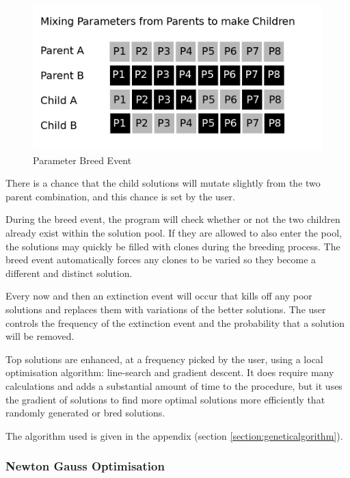 \begin{figure}[h]
  \begin{center}
    \includegraphics[scale=0.30]{chapters/potentials_fe_pd_ru/images/breeding.png}
    \caption{Parameter Breed Event}
    \label{fig:gabreedevent}
  \end{center}
\end{figure}

There is a chance that the child solutions will mutate slightly from the two parent combination, and this chance is set by the user.

During the breed event, the program will check whether or not the two children already exist within the solution pool.  If they are allowed to also enter the pool, the solutions may quickly be filled with clones during the breeding process.  The breed event automatically forces any clones to be varied so they become a different and distinct solution.

Every now and then an extinction event will occur that kills off any poor solutions and replaces them with variations of the better solutions.  The user controls the frequency of the extinction event and the probability that a solution will be removed.

Top solutions are enhanced, at a frequency picked by the user, using a local optimisation algorithm: line-search and gradient descent.  It does require many calculations and adds a substantial amount of time to the procedure, but it uses the gradient of solutions to find more optimal solutions more efficiently that randomly generated or bred solutions.

The algorithm used is given in the appendix (section \ref{section:geneticalgorithm}).


\subsubsection{Newton Gauss Optimisation}

